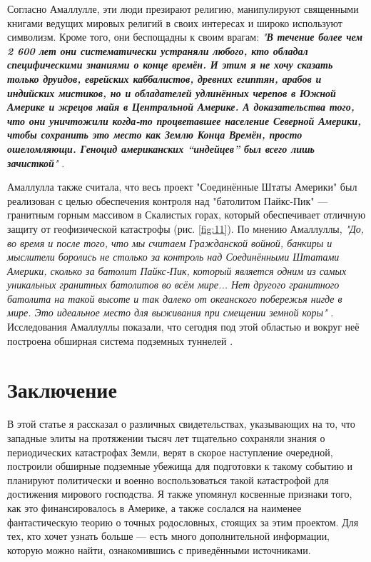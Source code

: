\documentclass[10pt,twocolumn,letterpaper]{article}
\begin{document}
Согласно Амаллулле, эти люди презирают религию, манипулируют священными книгами ведущих мировых религий в своих интересах и широко используют символизм. Кроме того, они беспощадны к своим врагам: \textit{"\textbf{В течение более чем 2 600 лет они систематически устраняли любого, кто обладал специфическими знаниями о конце времён. И этим я не хочу сказать только друидов, еврейских каббалистов, древних египтян, арабов и индийских мистиков, но и обладателей удлинённых черепов в Южной Америке и жрецов майя в Центральной Америке. А доказательства того, что они уничтожили когда-то процветавшее население Северной Америки, чтобы сохранить это место как Землю Конца Времён, просто ошеломляющи. Геноцид американских “индейцев” был всего лишь зачисткой}"} \cite{33,34}.

Амаллулла также считала, что весь проект "Соединённые Штаты Америки" был реализован с целью обеспечения контроля над "батолитом Пайкс-Пик" — гранитным горным массивом в Скалистых горах, который обеспечивает отличную защиту от геофизической катастрофы (рис. \ref{fig:11}). По мнению Амаллуллы, \textit{"До, во время и после того, что мы считаем Гражданской войной, банкиры и мыслители боролись не столько за контроль над Соединёнными Штатами Америки, сколько за батолит Пайкс-Пик, который является одним из самых уникальных гранитных батолитов во всём мире... Нет другого гранитного батолита на такой высоте и так далеко от океанского побережья нигде в мире. Это идеальное место для выживания при смещении земной коры"} \cite{33,34}. Исследования Амаллуллы показали, что сегодня под этой областью и вокруг неё построена обширная система подземных туннелей \cite{36}.

\section{Заключение}

В этой статье я рассказал о различных свидетельствах, указывающих на то, что западные элиты на протяжении тысяч лет тщательно сохраняли знания о периодических катастрофах Земли, верят в скорое наступление очередной, построили обширные подземные убежища для подготовки к такому событию и планируют политически и военно воспользоваться такой катастрофой для достижения мирового господства. Я также упомянул косвенные признаки того, как это финансировалось в Америке, а также сослался на наименее фантастическую теорию о точных родословных, стоящих за этим проектом. Для тех, кто хочет узнать больше — есть много дополнительной информации, которую можно найти, ознакомившись с приведёнными источниками.
\end{document}
